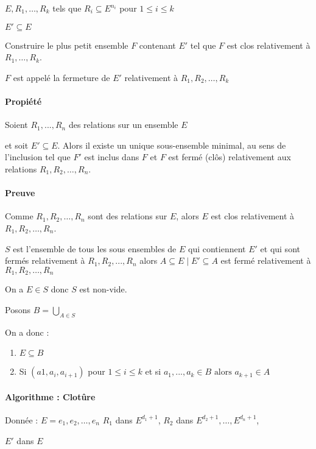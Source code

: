 \documentclass[12pt, a4paper]{report}
\begin{document}
$E, R_1, \dots, R_k$ tels que $R_i \subseteq E^{n_i}$ pour $1 \leq i \leq k$

$E' \subseteq E$

Construire le plus petit ensemble $F$ contenant $E'$ tel que $F$ est clos
relativement à $R_1, \dots, R_k$.

$F$ est appelé la fermeture de $E'$ relativement à $R_1, R_2, \dots, R_k$

\paragraph{Propiété}
Soient $R_1,..., R_n$ des relations sur un ensemble $E$

et soit $E' \subseteq E$. Alors il existe un unique sous-ensemble minimal, au 
sens de l'inclusion tel que $F'$ est inclus dans $F$ et $F$ est fermé (clôs) 
relativement aux relations $R_1, R_2,\dots, R_n$.

\paragraph{Preuve}

Comme $R_1, R_2, \dots, R_n$ sont des relations sur $E$, alors $E$ est clos relativement à
$R_1, R_2, \dots, R_n$.

$S$ est l'ensemble de tous les sous ensembles de $E$ qui contiennent $E'$ et qui sont
fermés relativement à $R_1, R_2, ..., R_n$
alors $ {A \subseteq E \mid E'\subseteq A}$ est fermé relativement à $R_1, R_2,\dots, R_n$

On a  $E \in S$ donc $S$ est non-vide.

Posons $B = \bigcup_{A\in S}$

On a donc : 
\begin{enumerate}
  \item $E \subseteq B$
  \item %
  Si $(a1, a_i, a_{i+1})$ pour $1 \leq i \leq k$
  et si $a_1, ..., a_k \in B \text{ alors } a_{k+1} \in A$
\end{enumerate}

\paragraph{Algorithme : Clotûre}

Donnée : $E = {e_1, e_2, \dots, e_n}$
$R_1$ dans $E^{d_1+1}$, $R_2$ dans $E^{d_2+1}, \dots, E^{d_n + 1}$,

$E'$ dans $E$
\end{document}
